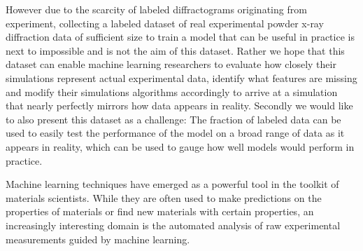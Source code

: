 However due to the scarcity of labeled diffractograms originating from experiment, collecting a labeled dataset
of real experimental powder x-ray diffraction data of sufficient size to train a model
that can be useful in practice is next to impossible and is not the aim of this dataset.
Rather we hope that this dataset can enable machine learning researchers to evaluate how closely their simulations
represent actual experimental data, identify what features are missing and modify their simulations algorithms
accordingly to arrive at a simulation that nearly perfectly mirrors how data appears in reality.
Secondly we would like to also present this dataset as a challenge: The fraction of labeled data can be used to
easily test the performance of the model on a broad range of data as it appears in reality, which can be used
to gauge how well models would perform in practice. 












Machine learning techniques have emerged as a powerful tool in the toolkit of
materials scientists. While they are often used to make predictions on
the properties of materials or find new materials with certain properties, an increasingly interesting domain is the automated analysis of raw experimental measurements
guided by machine learning\supercite{radovicMachineLearningEnergy2018}.

